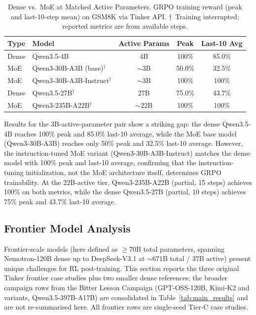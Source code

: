 \documentclass{article}
\begin{document}
\begin{table}[htbp]
\centering
\caption{Dense vs.~MoE at Matched Active Parameters. GRPO training reward (peak and
last-10-step mean) on GSM8K via Tinker API.
$\dagger$~Training interrupted; reported metrics are from available steps.}
\label{tab:dense_moe}
\begin{tabular}{llccc}
\toprule
\textbf{Type} & \textbf{Model} & \textbf{Active Params} & \textbf{Peak} & \textbf{Last-10 Avg} \\
\midrule
Dense & Qwen3.5-4B & 4B & 100\% & 85.0\% \\
MoE & Qwen3-30B-A3B (base)$^\dagger$ & $\sim$3B & 50.0\% & 32.5\% \\
MoE & Qwen3-30B-A3B-Instruct$^\dagger$ & $\sim$3B & 100\% & 100\% \\
\midrule
Dense & Qwen3.5-27B$^\dagger$ & 27B & 75.0\% & 43.7\% \\
MoE & Qwen3-235B-A22B$^\dagger$ & $\sim$22B & 100\% & 100\% \\
\bottomrule
\end{tabular}
\end{table}

Results for the 3B-active-parameter pair show a striking gap: the dense
Qwen3.5-4B reaches 100\% peak and 85.0\% last-10 average, while the
MoE base model (Qwen3-30B-A3B) reaches only 50\% peak and 32.5\% last-10
average. However, the instruction-tuned MoE variant (Qwen3-30B-A3B-Instruct)
matches the dense model with 100\% peak and last-10 average, confirming that
the instruction-tuning initialization, not the MoE architecture itself,
determines GRPO trainability. At the 22B-active tier, Qwen3-235B-A22B
(partial, 15 steps) achieves 100\% on both metrics, while the dense
Qwen3.5-27B (partial, 10 steps) achieves 75\% peak and 43.7\% last-10 average.

\subsection{Frontier Model Analysis}
\label{sec:frontier}

Frontier-scale models (here defined as $\ge 70$B total parameters,
spanning Nemotron-120B dense up to DeepSeek-V3.1 at $\sim 671$B
total / $37$B active) present unique challenges for RL post-training.
This section reports the three original Tinker frontier case
studies plus two smaller dense references; the broader
campaign rows from the Bitter Lesson Campaign
(GPT-OSS-120B, Kimi-K2 and variants, Qwen3.5-397B-A17B) are
consolidated in Table~\ref{tab:main_results} and are not
re-summarised here. All frontier rows are single-seed Tier-C case
studies.
\end{document}
